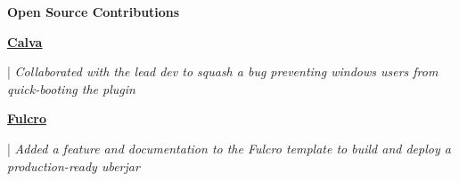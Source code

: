 \documentclass[letterpaper,11pt]{article}
\begin{document}
\textbf{\large \textcolor{magic_blue}{Open Source Contributions}}

\begin{minipage}[t]{0.08\textwidth}
	\raggedright
	\href{https://github.com/BetterThanTomorrow/calva/issues/2325}{ \underline{\textbf{Calva}}} \\
\end{minipage}
\hfill
\begin{minipage}[t]{0.90\textwidth}
	\raggedright
	|\textit{ Collaborated with the lead dev to squash a bug preventing windows users from quick-booting the plugin } \\
\end{minipage}

\begin{minipage}[t]{0.08\textwidth}
	\raggedright
	\href{https://github.com/fulcrologic/fulcro-template/pull/28}{ \underline{\textbf{Fulcro}}} \\
\end{minipage}
\hfill
\begin{minipage}[t]{0.90\textwidth}
	\raggedright
	|\textit{ Added a feature and documentation to the Fulcro template to build and deploy a production-ready uberjar } \\
\end{minipage}

\end{document}
